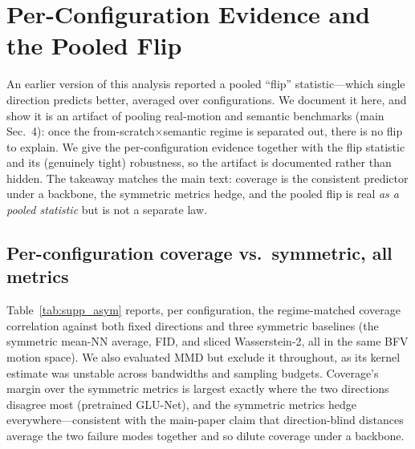 \documentclass[runningheads]{llncs}
\newcommand{\dbt}{d_{B\to T}}
\begin{document}
\begin{table}[h]
\centering
\caption{\textbf{Motion-coverage law, every configuration} (main-paper
Table~3 plus the off-design from-scratch rows). Within-context Spearman $\rho$
(transfer vs.\ $-$distance); $\dbt$ (coverage) in \textbf{bold}.}
\label{tab:law_full}
\scriptsize
\setlength{\tabcolsep}{3pt}

\end{table}

\begin{table}[h]
\centering
\caption{\textbf{Appearance (DINO) control, every configuration} (main-paper
Table~4 plus the off-design from-scratch rows). No direction carries usable
ranking signal in any regime.}
\label{tab:lawdino_full}
\scriptsize
\setlength{\tabcolsep}{3pt}

\end{table}

\section{Per-Configuration Evidence and the Pooled Flip}
\label{supp:law}

An earlier version of this analysis reported a pooled ``flip'' statistic---which
single direction predicts better, averaged over configurations. We document it
here, and show it is an artifact of pooling real-motion and semantic benchmarks
(main Sec.~4): once the from-scratch$\times$semantic regime is separated
out, there is no flip to explain. We give the per-configuration evidence
together with the flip statistic and its (genuinely tight) robustness, so the
artifact is documented rather than hidden. The takeaway matches the main text:
coverage is the consistent predictor under a backbone, the symmetric metrics
hedge, and the pooled flip is real \emph{as a pooled statistic} but is not a
separate law.

\subsection{Per-configuration coverage vs.\ symmetric, all metrics}
Table~\ref{tab:supp_asym} reports, per configuration, the regime-matched
coverage correlation against both fixed directions and three symmetric baselines
(the symmetric mean-NN average, FID, and sliced Wasserstein-2, all in the
same BFV motion space). We also evaluated MMD but exclude it throughout, as its
kernel estimate was unstable across bandwidths and sampling budgets. Coverage's margin over the symmetric metrics is largest
exactly where the two directions disagree most (pretrained GLU-Net), and the
symmetric metrics hedge everywhere---consistent with the main-paper claim that
direction-blind distances average the two failure modes together and so dilute
coverage under a backbone.
\end{document}
